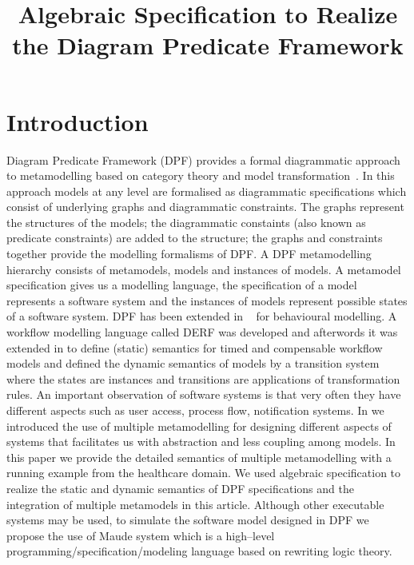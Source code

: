 \documentclass{eceasst}
\title{Algebraic Specification to Realize the Diagram Predicate Framework} %
\begin{document}
\maketitle

\section{Introduction}
Diagram Predicate Framework (DPF) provides a formal diagrammatic approach to metamodelling based on category theory and model transformation~\cite{Rutle10}. 
In this approach models at any level are formalised as diagrammatic specifications which consist of underlying graphs and diagrammatic constraints. 
The graphs represent the structures of the models; the diagrammatic constaints (also known as predicate constraints) are added to the structure; 
the graphs and constraints together provide the modelling formalisms of DPF. 
A DPF metamodelling hierarchy consists of metamodels, models and instances of models. 
A metamodel specification gives us a modelling language, the specification of a model represents a software system and the instances of models represent possible states of a software system. 
DPF has been extended in ~\cite{RutleMacCaullEtAl2012ECMFA,RutleWMFHIES12} for behavioural modelling. 
A workflow modelling language called DERF was developed and afterwords it was extended in \cite{WangRutleEtAl2012TASE} to define (static) semantics for timed and compensable workflow models and 
defined the dynamic semantics of models by a transition system where the states are instances and transitions are applications of transformation rules. 
An important observation of software systems is that very often they have different aspects such as user access, process flow, notification systems. 
In \cite{PAHI14} we introduced the use of multiple metamodelling for designing different aspects of systems that facilitates us with abstraction and less coupling among models. 
In this paper we provide the detailed semantics of multiple metamodelling with a running example from the healthcare domain. 
We used algebraic specification to realize the static and dynamic semantics of DPF specifications and the integration of multiple metamodels in this article. 
Although other executable systems may be used, to simulate the software model designed in DPF we propose the use of Maude system \cite{Bruni2006,Clavel2007} 
which is a high--level programming/specification/modeling language based on rewriting logic theory. 
\end{document}
